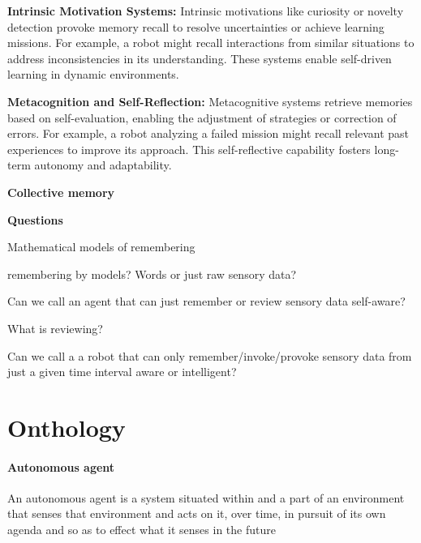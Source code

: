 \documentclass{book}
\providecommand{\ProjectDeepHeading}[2]{%
    \par\medskip\noindent\textbf{#2}\par\smallskip
}
\begin{document}
        \textbf{Intrinsic Motivation Systems:} Intrinsic motivations like curiosity or novelty detection provoke memory recall to resolve uncertainties or achieve learning missions. For example, a robot might recall interactions from similar situations to address inconsistencies in its understanding. These systems enable self-driven learning in dynamic environments.

        \textbf{Metacognition and Self-Reflection:} Metacognitive systems retrieve memories based on self-evaluation, enabling the adjustment of strategies or correction of errors. For example, a robot analyzing a failed mission might recall relevant past experiences to improve its approach. This self-reflective capability fosters long-term autonomy and adaptability.


\ProjectDeepHeading{6}{Collective memory}



\ProjectDeepHeading{6}{Questions}
Mathematical models of remembering

remembering by models? Words or just raw sensory data?

Can we call an agent that can just remember or review sensory data self-aware?

What is reviewing?

Can we call a a robot that can only remember/invoke/provoke sensory data from just a given time interval aware or intelligent?

\section{Onthology}


\cite{goncalves-etal-2023-ieee-autonomous-robotics-ontology}


\paragraph{Autonomous agent}
        An autonomous agent is a system situated within and a part of an environment that senses that environment and acts on it, over time, in pursuit of its own agenda and so as to effect what it senses in the future
        \cite{franklin-1997-is-it-an-agent-or-just-a-program-a-taxonomy-for-autonomous-agents}

\end{document}
